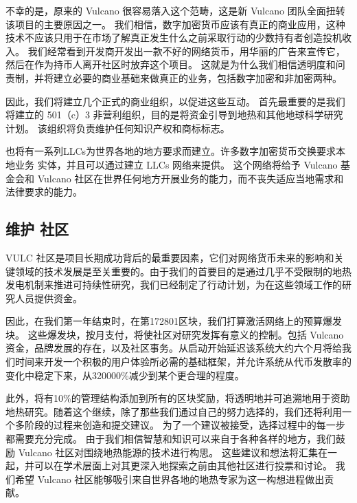 \documentclass[A4paper, 12pt]{article}
\begin{document}
不幸的是，原来的 Vulcano 很容易落入这个范畴，这是新 Vulcano 团队全面扭转该项目的主要原因之一。  我们相信，数字加密货币应该有真正的商业应用，这种技术不应该只用于在市场了解真正发生什么之前采取行动的少数持有者创造投机收入。  我们经常看到开发商开发出一款不好的网络货币，用华丽的广告来宣传它，然后在作为持币人离开社区时放弃这个项目。   这就是为什么我们相信透明度和问责制，并将建立必要的商业基础来做真正的业务，包括数字加密和非加密两种。 

因此，我们将建立几个正式的商业组织，以促进这些互动。  首先最重要的是我们将建立的 501（c）3 非营利组织，目的是将资金引导到地热和其他地球科学研究计划。  该组织将负责维护任何知识产权和商标标志。 

也将有一系列LLCs为世界各地的地方要求而建立。许多数字加密货币交换要求本地业务 实体，并且可以通过建立 LLCs 网络来提供。  这个网络将给予 Vulcano 基金会和 Vulcano 社区在世界任何地方开展业务的能力，而不丧失适应当地需求和法律要求的能力。

\subsection{维护 社区}
VULC 社区是项目长期成功背后的最重要因素，它们对网络货币未来的影响和关键领域的技术发展是至关重要的。由于我们的首要目的是通过几乎不受限制的地热发电机制来推进可持续性研究，我们已经制定了行动计划，为在这些领域工作的研究人员提供资金。 

因此，在我们第一年结束时，在第172801区块，我们打算激活网络上的预算爆发块。  这些爆发块，按月支付，将使社区对研究发挥有意义的控制。包括 Vulcano 资金，品牌发展的存在，以及社区事务。从启动开始延迟该系统大约六个月将给我们时间来开发一个积极的用户体验所必需的基础框架，并允许系统从代币发散率的变化中稳定下来，从320000\%减少到某个更合理的程度。

此外，将有10\%的管理结构添加到所有的区块奖励，将透明地并可追溯地用于资助地热研究。随着这个继续，除了那些我们通过自己的努力选择的，我们还将利用一个多阶段的过程来创造和提交建议。  为了一个建议被接受，选择过程中的每一步都需要充分完成。   由于我们相信智慧和知识可以来自于各种各样的地方，我们鼓励 Vulcano 社区对围绕地热能源的技术进行构思。  这些建议和想法将汇集在一起，并可以在学术层面上对其更深入地探索之前由其他社区进行投票和讨论。  我们希望 Vulcano 社区能够吸引来自世界各地的地热专家为这一构想进程做出贡献。
\end{document}
